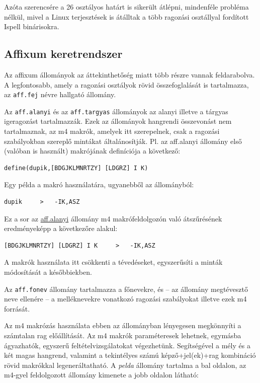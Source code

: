 \begin{enumerate}
Azóta szerencsére a 26 osztályos határt is sikerült átlépni,
mindenféle probléma nélkül, mivel a
Linux terjesztések is átálltak a több ragozási osztállyal
fordított Ispell binárisokra.
\end{enumerate}

\subsection{Affixum keretrendszer}

Az affixum állományok az áttekinthetőség miatt
több részre vannak feldarabolva. A legfontosabb, amely
a ragozási osztályok rövid összefoglalását is
tartalmazza, az \texttt{aff.fej} névre hallgató állomány.

Az \texttt{aff.alanyi} és az \texttt{aff.targyas} állományok az alanyi illetve
a tárgyas igeragozást tartalmazzák. Ezek az állományok
hangrendi összevonást nem tartalmaznak, az m4 makrók,
amelyek itt szerepelnek, csak a ragozási szabályokban
szereplő mintákat általánosítják. Pl. az aff.alanyi
állomány első (valóban is használt) makrójának definíciója
a következő:

\begin{verbatim}
define(dupik,[BDGJKLMNRTZY] [LDGRZ] I K)
\end{verbatim}

Egy példa a makró használatára, ugyanebből az állományból:

\begin{verbatim}
dupik     >   -IK,ASZ
\end{verbatim}

Ez a sor az \url{aff.alanyi} állomány m4 makrófeldolgozón való
átszűrésének eredményeképp a következőre alakul:

\begin{verbatim}
[BDGJKLMNRTZY] [LDGRZ] I K     >   -IK,ASZ
\end{verbatim}

A makrók használata itt csökkenti a tévedéseket, egyszerűsíti
a minták módosítását a későbbiekben.

Az \texttt{aff.fonev} állomány tartalmazza a főnevekre, és
-- az állomány megtévesztő neve ellenére -- a melléknevekre
vonatkozó ragozási szabályokat illetve ezek m4 forrását.

Az m4 makrózás használata ebben az állományban lényegesen megkönnyíti a 
számtalan rag előállítását. Az m4
makrók paraméteresek lehetnek, egymásba ágyazhatók,
egyszerű feltételvizsgálatokat végezhetünk. Segítségével a mély és a
két magas hangrend, valamint a tekintélyes számú képző+jel(ek)+rag
kombináció rövid makrókkal legeneráltatható. A \emph{pelda} állomány
tartalma a bal oldalon, az m4-gyel feldolgozott állomány kimenete
a jobb oldalon látható:

